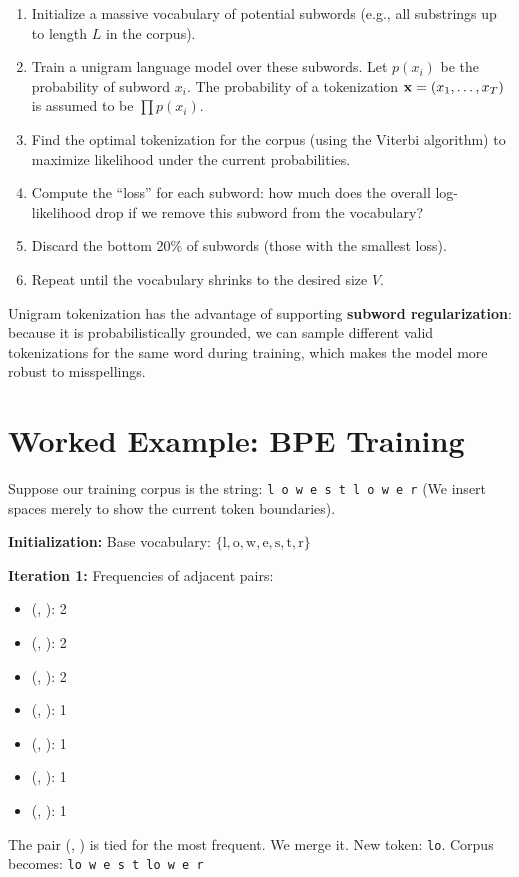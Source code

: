\begin{enumerate}
    \item Initialize a massive vocabulary of potential subwords (e.g., all substrings up to length $L$ in the corpus).
    \item Train a unigram language model over these subwords. Let $p(x_i)$ be the probability of subword $x_i$. The probability of a tokenization $\mathbf{x} = (x_1, \ldots, x_T)$ is assumed to be $\prod p(x_i)$.
    \item Find the optimal tokenization for the corpus (using the Viterbi algorithm) to maximize likelihood under the current probabilities.
    \item Compute the ``loss'' for each subword: how much does the overall log-likelihood drop if we remove this subword from the vocabulary?
    \item Discard the bottom 20\% of subwords (those with the smallest loss).
    \item Repeat until the vocabulary shrinks to the desired size $V$.
\end{enumerate}

Unigram tokenization has the advantage of supporting \textbf{subword regularization}: because it is probabilistically grounded, we can sample different valid tokenizations for the same word during training, which makes the model more robust to misspellings.

\section{Worked Example: BPE Training}
\label{ch:07:sec:example}

Suppose our training corpus is the string: \texttt{l o w e s t l o w e r}
(We insert spaces merely to show the current token boundaries).

\textbf{Initialization:}
Base vocabulary: $\{\text{l}, \text{o}, \text{w}, \text{e}, \text{s}, \text{t}, \text{r}\}$

\textbf{Iteration 1:}
Frequencies of adjacent pairs:
\begin{itemize}
    \item (, ): 2
    \item (, ): 2
    \item (, ): 2
    \item (, ): 1
    \item (, ): 1
    \item (, ): 1
    \item (, ): 1
\end{itemize}
The pair (, ) is tied for the most frequent. We merge it.
New token: \texttt{lo}.
Corpus becomes: \texttt{lo w e s t lo w e r}


